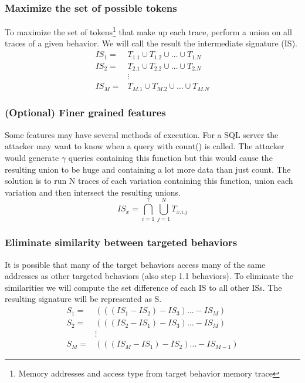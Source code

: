 \documentclass[11pt, oneside]{article}
\begin{document}
\subsubsection{Maximize the set of possible tokens}
To maximize the set of tokens\footnote{Memory addresses and access type from 
target behavior memory trace} that make up each trace, perform a union on all 
traces of a given behavior.  We will call the result the intermediate 
signature (IS).
\begin{align*}
IS_1 =& T_{1.1}\cup T_{1.2}\cup\ldots\cup T_{1.N} \\
IS_2 =& T_{2.1}\cup T_{2.2}\cup\ldots\cup T_{2.N} \\
      &\vdots \\
IS_M =& T_{M.1}\cup T_{M.2}\cup\ldots\cup T_{M.N}
\end{align*}

\subsubsection{(Optional) Finer grained features}
Some features may have several methods of execution. For a SQL server the 
attacker may want to know when a query with count() is called. The attacker 
would generate $\gamma$ queries containing this function but this would cause 
the resulting union to be huge and containing a lot more data than just count. 
The solution is to run N traces of each variation containing this function, 
union each variation and then intersect the resulting unions. \\
$$IS_x = \bigcap_{i=1}^{\gamma}\bigcup_{j=1}^{N}T_{x.i.j}$$

\subsubsection{Eliminate similarity between targeted behaviors}
It is possible that many of the target behaviors access many of the same 
addresses as other targeted behaviors (also step 1.1 behaviors). To eliminate 
the similarities we will compute the set difference of each IS to all other 
ISs. The resulting signature will be represented as S. \\
\begin{align*}
S_1 =& (((IS_1 - IS_2) - IS_3)\ldots - IS_M) \\
S_2 =& (((IS_2 - IS_1) - IS_3)\ldots - IS_M) \\
    &\vdots \\
S_M =& (((IS_M - IS_1) - IS_2)\ldots - IS_{M-1})
\end{align*}
\end{document}
